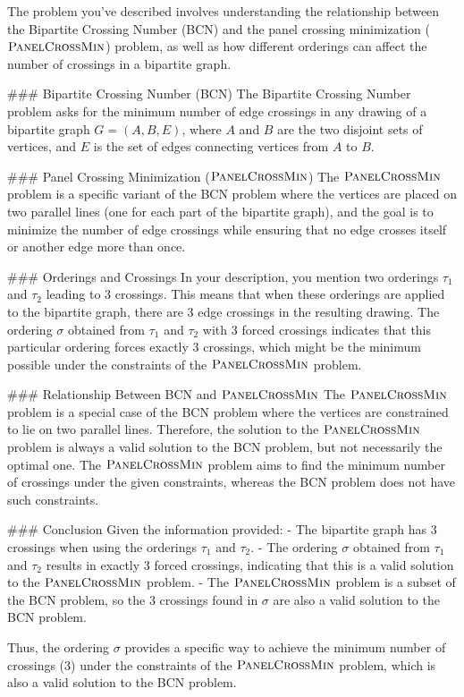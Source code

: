 The problem you've described involves understanding the relationship between the Bipartite Crossing Number (BCN) and the panel crossing minimization (\(\textsc{PanelCrossMin}\)) problem, as well as how different orderings can affect the number of crossings in a bipartite graph.

### Bipartite Crossing Number (BCN)
The Bipartite Crossing Number problem asks for the minimum number of edge crossings in any drawing of a bipartite graph \(G = (A, B, E)\), where \(A\) and \(B\) are the two disjoint sets of vertices, and \(E\) is the set of edges connecting vertices from \(A\) to \(B\).

### Panel Crossing Minimization (\(\textsc{PanelCrossMin}\))
The \(\textsc{PanelCrossMin}\) problem is a specific variant of the BCN problem where the vertices are placed on two parallel lines (one for each part of the bipartite graph), and the goal is to minimize the number of edge crossings while ensuring that no edge crosses itself or another edge more than once.

### Orderings and Crossings
In your description, you mention two orderings \(\tau_1\) and \(\tau_2\) leading to 3 crossings. This means that when these orderings are applied to the bipartite graph, there are 3 edge crossings in the resulting drawing. The ordering \(\sigma\) obtained from \(\tau_1\) and \(\tau_2\) with 3 forced crossings indicates that this particular ordering forces exactly 3 crossings, which might be the minimum possible under the constraints of the \(\textsc{PanelCrossMin}\) problem.

### Relationship Between BCN and \(\textsc{PanelCrossMin}\)
The \(\textsc{PanelCrossMin}\) problem is a special case of the BCN problem where the vertices are constrained to lie on two parallel lines. Therefore, the solution to the \(\textsc{PanelCrossMin}\) problem is always a valid solution to the BCN problem, but not necessarily the optimal one. The \(\textsc{PanelCrossMin}\) problem aims to find the minimum number of crossings under the given constraints, whereas the BCN problem does not have such constraints.

### Conclusion
Given the information provided:
- The bipartite graph has 3 crossings when using the orderings \(\tau_1\) and \(\tau_2\).
- The ordering \(\sigma\) obtained from \(\tau_1\) and \(\tau_2\) results in exactly 3 forced crossings, indicating that this is a valid solution to the \(\textsc{PanelCrossMin}\) problem.
- The \(\textsc{PanelCrossMin}\) problem is a subset of the BCN problem, so the 3 crossings found in \(\sigma\) are also a valid solution to the BCN problem.

Thus, the ordering \(\sigma\) provides a specific way to achieve the minimum number of crossings (3) under the constraints of the \(\textsc{PanelCrossMin}\) problem, which is also a valid solution to the BCN problem.